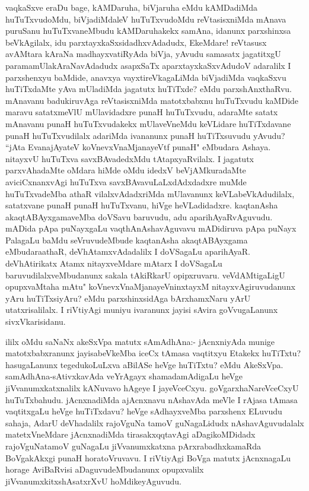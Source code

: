 \begin{artha}
vaqkaSxve eraDu bage, kAMDaruha, biVjaruha eMdu kAMDadiMda huTuTxvudoMdu, biVjadiMdaleV huTuTxvudoMdu reVtasisxniMda mAnava puruSanu huTuTxvaneMbudu kAMDaruhakekx samAna, idanunx parxshinxsa beVkAgilalx, idu parxtayxkaSxsidadhxvAdadudx, EkeMdare! reVtasusx avAMtara kAraNa madhayxvatiRyAda biVja, yAvudu samasatx jagatitxgU paramamUlakAraNavAdadudx asapxSaTx aparxtayxkaSxvAdudoV adaralilx I parxshenxyu  baMdide, anavxya vayxtireVkagaLiMda biVjadiMda vaqkaSxvu huTiTxdaMte yAva mUladiMda jagatutx huTiTxde? eMdu parxshAnxthaRvu. mAnavanu badukiruvAga reVtasisxniMda matotxbabxnu huTuTxvudu kaMDide maravu satatxmeVlU mUlavidadxre punaH huTuTxvudu, adaraMte satatx mAnavanu punaH huTuTxvudakekx mUlaveVneMdu keVLidare huTiTxdavane punaH huTuTxvudilalx adariMda ivananunx punaH huTiTxsuvudu  yAvudu? ``jAta EvanajAyateV koVnevxVnaMjanayeVtf punaH" eMbudara Ashaya. nitayxvU huTuTxva savxBAvadedxMdu tAtapxyaRvilalx. I jagatutx parxvAhadaMte oMdara hiMde oMdu idedxV beVjAMkuradaMte aviciCxnanxvAgi huTuTxva savxBAvavuLaLxdAdxdadxre muMde huTuTxvadeMba athaR vilalxvAdadxriMda mUlavanunx keVLabeVkAdudilalx, satatxvane punaH punaH huTuTxvanu, hiVge heVLadidadxre. kaqtanAsha akaqtABAyxgamaveMba doVSavu baruvudu, adu aparihAyaRvAguvudu. mADida pApa puNayxgaLu vaqthAnAshavAguvavu mADidiruva pApa puNayx PalagaLu baMdu seVruvudeMbude kaqtanAsha akaqtABAyxgama eMbudaraathaR, deVhAtamxvAdadalilx I doVSagaLu aparihAyaR. deVhAtirikatx Atamx nitayxveMdare mAtarx I doVSagaLu baruvudilalxveMbudanunx sakala tAkiRkarU opipxruvaru. veVdAMtigaLigU opupxvaMtaha mAtu" koVnevxVnaMjanayeVninxtayxM nitayxvAgiruvudanunx yAru huTiTxsiyAru? eMdu parxshinxsidAga bArxhamxNaru yArU utatxrisalilalx. I riVtiyAgi muniyu ivaranunx jayisi sAvira goVvugaLanunx sivxVkarisidanu.
\end{artha}%


\begin{artha}
ililx oMdu saNaNx akeSxVpa matutx sAmAdhAna:- jAcnxniyAda munige matotxbabxranunx jayisabeVkeMba iceCx tAmasa vaqtitxyu Etakekx huTiTxtu? hasugaLanunx tegedukoLuLxva aBilASe heVge huTiTxtu? eMdu AkeSxVpa. samAdhAna-sAtivxkavAda veYrAgayx shamadamAdigaLu heVge jiVvanumxkatxnalilx kANuvavo hAgeye I jayeVceCxyu. goVgarxhaNareVceCxyU huTuTxbahudu. jAcnxnadiMda ajAcnxnavu nAshavAda meVle I rAjasa tAmasa vaqtitxgaLu heVge huTiTxdavu? heVge sAdhayxveMba parxshenx ELuvudu sahaja, AdarU deVhadalilx rajoVguNa tamoV guNagaLidudx nAshavAguvudalalx matetxVneMdare jAcnxnadiMda tirasakxqqtavAgi aDagikoMDidadx rajoVguNatamoV guNagaLu jiVvanumxkatxna pArxrabadhxkamaRda BoVgakAkxgi punaH horatoVruvavu. I riVtiyAgi BoVga matutx jAcnxnagaLu horage AviBaRvisi aDaguvudeMbudanunx opupxvalilx jiVvanumxkitxshAsatxrXvU hoMdikeyAguvudu. 
\end{artha}

